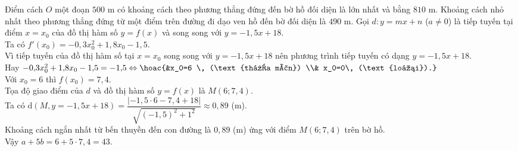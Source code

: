 \begin{ex}
{\begin{itemchoice}
\begin{center}
 			\end{center}
 			Điểm cách $O$ một đoạn $500$ m có khoảng cách theo phương thẳng đứng đến bờ hồ đối diện là lớn nhất và bằng $810$ m.
 			\itemch Khoảng cách nhỏ nhất theo phương thẳng đứng từ một điểm trên đường đi dạo ven hồ đến bờ đối diện là $490$ m.
 			\itemch Gọi $d\colon y=mx+n$ ($a \neq 0$) là tiếp tuyến tại điểm $x=x_0$ của đồ thị hàm số $y=f(x)$ và song song với $y=-1{,}5x+18$.\\
 			Ta có $f'\left(x_0\right)=-0{,}3 x_0^2+1{,}8 x_0-1{,}5$.\\
 			Vì tiếp tuyến của đồ thị hàm số tại $x=x_0$ song song với $y=-1{,}5 x+18$ nên phương trình tiếp tuyến có dạng $y=-1{,}5 x+18$.\\		
 			Hay $-0{,}3 x_0^2+1{,}8 x_0-1{,}5=-1{,}5 \Leftrightarrow\hoac{&x_0=6 \, (\text{thỏa mãn}) \\& x_0=0\, (\text{loại}).}$\\
 			Với $x_0=6$ thì $f\left(x_0\right)=7{,}4$.\\
 			Tọa độ giao điểm của $d$ và đồ thị hàm số $y=f(x)$ là $M(6;7{,}4)$.\\
 			Ta có $\mathrm{d}(M,y=-1{,}5x+18)=\dfrac{|-1{,}5\cdot 6-7{,}4+18|}{\sqrt{(-1{,}5)^2+1^2}} \approx 0{,}89$ (m).\\
 			Khoảng cách ngắn nhất từ bến thuyền đến con đường là $0{,}89$ (m) ứng với điểm $M(6; 7{,}4)$ trên bờ hồ.\\
 			Vậy $a+5b=6+5\cdot 7{,}4=43$.
 		\end{itemchoice}	
 	}
 \end{ex}
